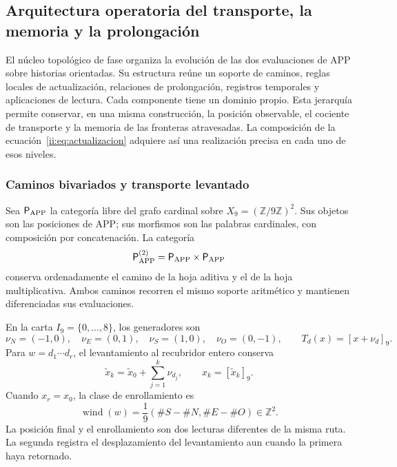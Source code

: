 \subsection{Arquitectura operatoria del transporte, la memoria y la prolongación}
\label{ii:ii:tpk-arquitectura}

El núcleo topológico de fase organiza la evolución de las dos evaluaciones
de APP sobre historias orientadas. Su estructura reúne un soporte de caminos,
reglas locales de actualización, relaciones de prolongación, registros
temporales y aplicaciones de lectura. Cada componente tiene un dominio
propio. Esta jerarquía permite conservar, en una misma construcción, la
posición observable, el cociente de transporte y la memoria de las
fronteras atravesadas. La composición de la ecuación~\eqref{ii:eq:actualizacion}
adquiere así una realización precisa en cada uno de esos niveles.

\subsubsection{Caminos bivariados y transporte levantado}

Sea \(\mathsf P_{\rm APP}\) la categoría libre del grafo cardinal sobre
\(X_9=(\mathbb Z/9\mathbb Z)^2\). Sus objetos son las posiciones de APP;
sus morfismos son las palabras cardinales, con composición por
concatenación. La categoría
\[
 \mathsf P_{\rm APP}^{(2)}
 =\mathsf P_{\rm APP}\times\mathsf P_{\rm APP}
\]
conserva ordenadamente el camino de la hoja aditiva y el de la hoja
multiplicativa. Ambos caminos recorren el mismo soporte aritmético y
mantienen diferenciadas sus evaluaciones.

En la carta \(I_9=\{0,\ldots,8\}\), los generadores son
\[
 \nu_N=(-1,0),\quad\nu_E=(0,1),\quad
 \nu_S=(1,0),\quad\nu_O=(0,-1),
 \qquad T_d(x)=[x+\nu_d]_9.
\]
Para \(w=d_1\cdots d_r\), el levantamiento al recubridor entero conserva
\[
 \widetilde x_k=\widetilde x_0+\sum_{j=1}^{k}\nu_{d_j},
 \qquad x_k=[\widetilde x_k]_9.
\]
Cuando \(x_r=x_0\), la clase de enrollamiento es
\begin{equation}
 \operatorname{wind}(w)
 =\frac{1}{9}(\#S-\#N,\#E-\#O)\in\mathbb Z^2.
 \label{ii:ii:tpk-enrollamiento}
\end{equation}
La posición final y el enrollamiento son dos lecturas diferentes de la
misma ruta. La segunda registra el desplazamiento del levantamiento aun
cuando la primera haya retornado.

